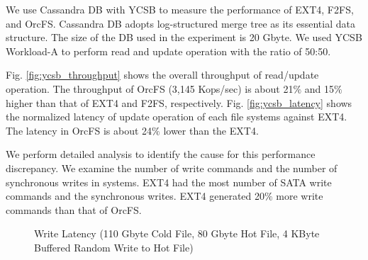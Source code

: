 \documentclass[prodmode,acmtecs]{acmsmall}
\begin{document}
We use Cassandra DB \cite{cassandraDB} with YCSB to measure the
performance of EXT4, F2FS, and OrcFS. Cassandra DB adopts
log-structured merge tree \cite{o1996log} as its essential data
structure.  The size of the DB used in the experiment is 20 Gbyte.  We
used YCSB Workload-A to perform read and update operation with the
ratio of 50:50.

Fig. \ref{fig:ycsb_throughput} shows the overall throughput of
read/update operation. The throughput of OrcFS (3,145 Kops/sec) is
about 21$\%$ and 15$\%$ higher than that of EXT4 and F2FS,
respectively. Fig. \ref{fig:ycsb_latency} shows the normalized latency
of update operation of each file systems against EXT4. The latency in
OrcFS is about 24$\%$ lower than the EXT4.

We perform detailed analysis to identify the cause for this
performance discrepancy.  We examine the number of write commands and
the number of synchronous writes in systems.  EXT4 had the most number
of SATA write commands and the synchronous writes. EXT4 generated
20$\%$ more write commands than that of OrcFS.



\begin{figure}[t]
  \centering
   \quad 
   \caption{Write Latency (110 Gbyte Cold File, 80 Gbyte Hot File, 4
     KByte Buffered Random Write to Hot File)\label{fig:lat_qpsc}}
\end{figure}
\end{document}
